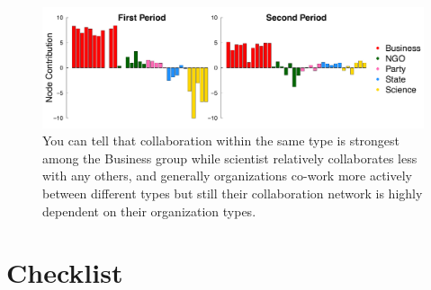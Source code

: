 \documentclass[12pt]{article}
\begin{document}
\begin{figure}[h]
	\centering
	\includegraphics[width=\linewidth]{../Figure/barplots.pdf}	
	\caption{You can tell that collaboration within the same type is strongest among the Business group while scientist relatively collaborates less with any others, and generally organizations co-work more actively between different types but still their collaboration network is highly dependent on their organization types.}
	\label{fig:barplots}
\end{figure}
\newpage
\section{Checklist}
\end{document}
